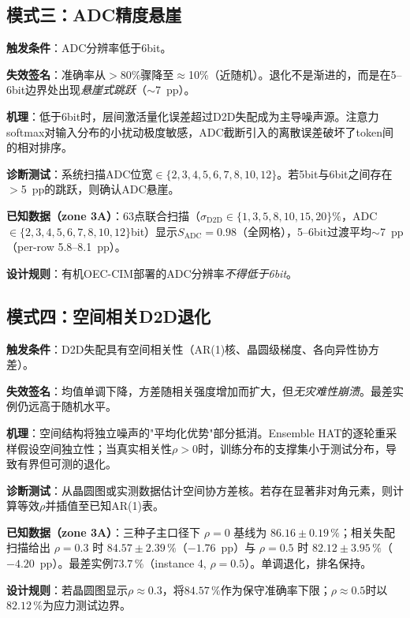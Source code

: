 \subsection{模式三：ADC精度悬崖}
\label{subsec:failure_adc_cliff}

\textbf{触发条件}：ADC分辨率低于6bit。

\textbf{失效签名}：准确率从$>$80\%骤降至$\approx$10\%（近随机）。退化不是渐进的，而是在5--6bit边界处出现\emph{悬崖式跳跃}（$\sim$7~pp）。

\textbf{机理}：低于6bit时，层间激活量化误差超过D2D失配成为主导噪声源。注意力softmax对输入分布的小扰动极度敏感，ADC截断引入的离散误差破坏了token间的相对排序。

\textbf{诊断测试}：系统扫描ADC位宽$\in\{2,3,4,5,6,7,8,10,12\}$。若5bit与6bit之间存在$>$5~pp的跳跃，则确认ADC悬崖。

\textbf{已知数据（zone 3A）}：63点联合扫描（$\sigma_{\mathrm{D2D}}\in\{1,3,5,8,10,15,20\}\%$，ADC$\in\{2,3,4,5,6,7,8,10,12\}$bit）显示$S_{\mathrm{ADC}}=0.98$（全网格），5--6bit过渡平均$\sim$7~pp（per-row 5.8--8.1~pp）。

\textbf{设计规则}：有机OEC-CIM部署的ADC分辨率\emph{不得低于6bit}。

\subsection{模式四：空间相关D2D退化}
\label{subsec:failure_correlated_d2d}

\textbf{触发条件}：D2D失配具有空间相关性（AR(1)核、晶圆级梯度、各向异性协方差）。

\textbf{失效签名}：均值单调下降，方差随相关强度增加而扩大，但\emph{无灾难性崩溃}。最差实例仍远高于随机水平。

\textbf{机理}：空间结构将独立噪声的"平均化优势"部分抵消。Ensemble HAT的逐轮重采样假设空间独立性；当真实相关性$\rho>0$时，训练分布的支撑集小于测试分布，导致有界但可测的退化。

\textbf{诊断测试}：从晶圆图或实测数据估计空间协方差核。若存在显著非对角元素，则计算等效$\rho$并插值至已知AR(1)表。

\textbf{已知数据（zone 3A）}：三种子主口径下 $\rho=0$ 基线为 $86.16\pm0.19\,\%$；相关失配扫描给出 $\rho=0.3$ 时 $84.57\pm2.39\,\%$（$-1.76$~pp）与 $\rho=0.5$ 时 $82.12\pm3.95\,\%$（$-4.20$~pp）。最差实例$73.7\,\%$（instance 4, $\rho=0.5$）。单调退化，排名保持。

\textbf{设计规则}：若晶圆图显示$\rho\approx0.3$，将$84.57\,\%$作为保守准确率下限；$\rho\approx0.5$时以$82.12\,\%$为应力测试边界。

